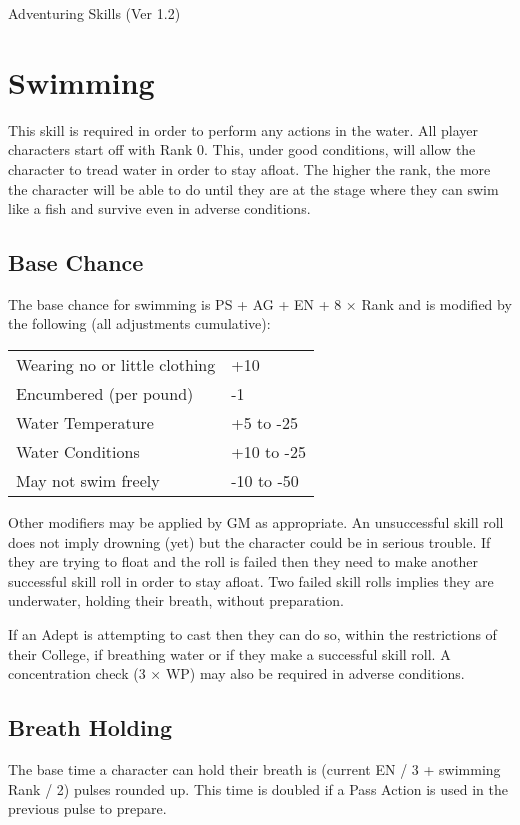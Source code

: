 \begin{Chapter}{Adventuring Skills (Ver 1.2)}
\section{Swimming}

This skill is required in order to perform any actions in the water.
All player characters start off with Rank 0.  This, under good
conditions, will allow the character to tread water in order to stay
afloat. The higher the rank, the more the character will be able to do
until they are at the stage where they can swim like a fish and
survive even in adverse conditions.

\subsection{Base Chance}

The base chance for swimming is PS + AG + EN + 8 × Rank and is
modified by the following (all adjustments cumulative):

\begin{tabularx}{\linewidth}{Xl} \\
Wearing no or little clothing	& +10 \\
Encumbered (per pound)		& -1 \\
Water Temperature		& +5 to -25 \\
Water Conditions		& +10 to -25 \\
May not swim freely		& -10 to -50 \\
\end{tabularx}

Other modifiers may be applied by GM as appropriate.  An unsuccessful
skill roll does not imply drowning (yet) but the character could be in
serious trouble.  If they are trying to float and the roll is failed
then they need to make another successful skill roll in order to stay
afloat.  Two failed skill rolls implies they are underwater, holding
their breath, without preparation.

If an Adept is attempting to cast then they can do so, within the
restrictions of their College, if breathing water or if they make a
successful skill roll.  A concentration check (3 × WP) may also be
required in adverse conditions.

\subsection{Breath Holding}

The base time a character can hold their breath is (current EN / 3 +
swimming Rank / 2) pulses rounded up.  This time is doubled if a Pass
Action is used in the previous pulse to prepare.


\end{Chapter}

